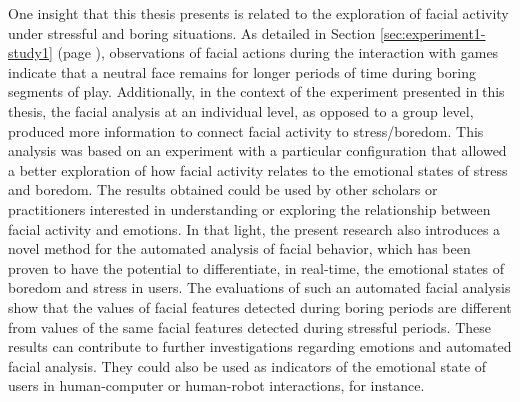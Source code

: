 One insight that this thesis presents is related to the exploration of facial activity under stressful and boring situations. As detailed in Section \ref{sec:experiment1-study1} (page \pageref{sec:experiment1-study1}), observations of facial actions during the interaction with games indicate that a neutral face remains for longer periods of time during boring segments of play. Additionally, in the context of the experiment presented in this thesis, the facial analysis at an individual level, as opposed to a group level, produced more information to connect facial activity to stress/boredom. This analysis was based on an experiment with a particular configuration that allowed a better exploration of how facial activity relates to the emotional states of stress and boredom. The results obtained could be used by other scholars or practitioners interested in understanding or exploring the relationship between facial activity and emotions. In that light, the present research also introduces a novel method for the automated analysis of facial behavior, which has been proven to have the potential to differentiate, in real-time, the emotional states of boredom and stress in users. The evaluations of such an automated facial analysis show that the values of facial features detected during boring periods are different from values of the same facial features detected during stressful periods. These results can contribute to further investigations regarding emotions and automated facial analysis. They could also be used as indicators of the emotional state of users in human-computer or human-robot interactions, for instance.



